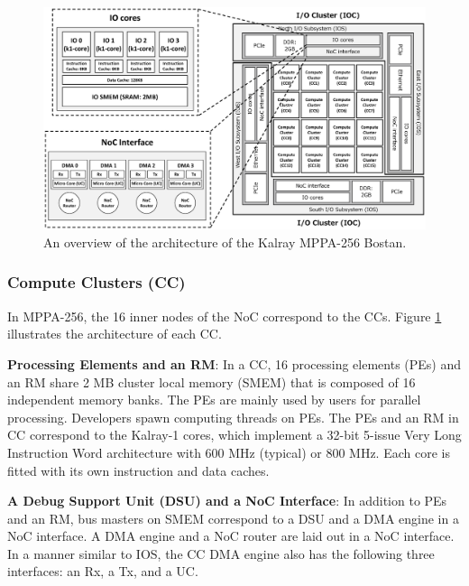 \documentclass[conference,compsoc]{IEEEtran}
\begin{document}
\begin{figure}[t]
  \centering
  \includegraphics[width=1.0\linewidth]{../figure/mppa_architecture.eps}
  \caption{\label{fig:mppa_architecture}
    An overview of the architecture of the Kalray MPPA-256 Bostan.}
\end{figure}

\subsubsection{Compute Clusters (CC)}
\label{sec:cc}
In MPPA-256, the 16 inner nodes of the NoC correspond to the CCs.
Figure \ref{fig:mppa_architecture} illustrates the architecture of each CC.

\textbf{Processing Elements and an RM}:
In a CC, 16 processing elements (PEs) and an RM share 2 MB cluster local memory (SMEM) that is composed of 16 independent memory banks.
The PEs are mainly used by users for parallel processing.
Developers spawn computing threads on PEs.
The PEs and an RM in CC correspond to the Kalray-1 cores, which implement a 32-bit 5-issue Very Long Instruction Word architecture with 600 MHz (typical) or 800 MHz.
Each core is fitted with its own instruction and data caches.

\textbf{A Debug Support Unit (DSU) and a NoC Interface}:
In addition to PEs and an RM, bus masters on SMEM correspond to a DSU and a DMA engine in a NoC interface.
A DMA engine and a NoC router are laid out in a NoC interface.
In a manner similar to IOS, the CC DMA engine also has the following three interfaces: an Rx, a Tx, and a UC. 
\end{document}
